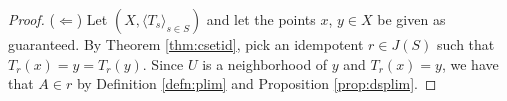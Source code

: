 \documentclass[12pt]{article}
\theoremstyle{plain}
\theoremstyle{definition}
\newcommand{\la}{\langle}
\newcommand{\ra}{\rangle}
\newcommand{\ds}{(X, \la T_s \ra_{s\in S})}
\begin{document}
\begin{proof}
   ($\Leftarrow$) Let $\ds$ and let the points $x$, $y \in X$ be given as
   guaranteed.
   By Theorem \ref{thm:csetid}, pick an idempotent $r \in J(S)$
   such that $T_r(x) = y = T_r(y)$. 
   Since $U$ is a neighborhood of $y$ and $T_r(x) = y$, we have that
   $A \in r$ by Definition \ref{defn:plim} and Proposition \ref{prop:dsplim}. 
 \end{proof}



\end{document}
